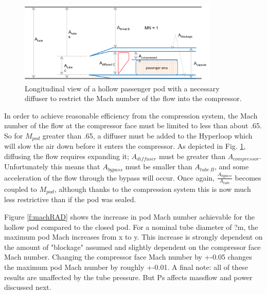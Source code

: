 \documentclass[heading.tex]{subfiles}
\begin{document}
\begin{figure}[hbtp]
\centering
\includegraphics[width=0.85\textwidth]{images/inletCapsule.png}
\caption{Longitudinal view of a hollow passenger pod with a necessary diffuser to restrict the Mach number of the flow into the compressor.}
\label{f:OpenPod}
\end{figure}

In order to achieve reasonable efficiency from the compression system, the Mach number of the flow at the compressor face
must be limited to less than about .65. So for $M_{pod}$ greater than .65, a diffuser must be added to the Hyperloop 
which will slow the air down before it enters the compressor. As depicted in Fig. \ref{f:OpenPod}, diffusing the flow 
requires expanding it; $A_{diffuser}$ must be greater than $A_{compressor}$. Unfortunately this means that
$A_{bypass}$ must be smaller than $A_{tube\ B}$, and some acceleration of the flow through the 
bypass will occur. Once again, $\frac{A_{bypass}}{A_{tube}}$ becomes coupled to $M_{pod}$, although thanks to the compression 
system this is now much less restrictive than if the pod was sealed. 

Figure \ref{f:machRAD} shows the increase in pod Mach number achievable for the hollow pod compared to the closed pod. For a nominal tube diameter of ?m, the maximum pod Mach increases from x to y. This increase is strongly dependent on the amount of "blockage" assumed and slightly dependent on the compressor face Mach number. Changing the compressor face Mach number by +-0.05 changes the maximum pod Mach number by roughly +-0.01.
A final note: all of these results are unaffected by the tube pressure. But Ps affects massflow and power discussed next.
\end{document}
